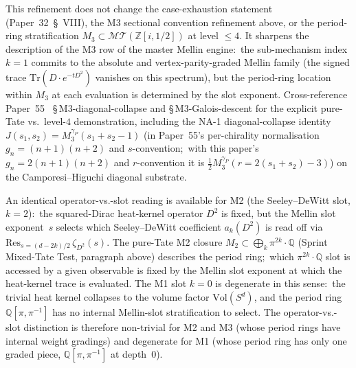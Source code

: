 \documentclass[aps,pra,twocolumn,superscriptaddress,longbibliography]{revtex4-2}
\begin{document}
This refinement does not change the case-exhaustion statement
(Paper~32~\S~VIII), the M3 sectional convention refinement
above, or the period-ring stratification
$M_3 \subset \mathcal{MT}(\mathbb{Z}[i, 1/2])$ at level $\le 4$.
It sharpens the description of the M3 row of the master Mellin
engine:\ the sub-mechanism index $k = 1$ commits to the
absolute and vertex-parity-graded Mellin family (the signed trace
$\mathrm{Tr}(D \cdot e^{-tD^2})$ vanishes on this spectrum), but the period-ring
location within $M_3$ at each evaluation is determined by the slot
exponent.  Cross-reference Paper~55~\cite{loutey_paper55}
\S\,M3-diagonal-collapse and \S\,M3-Galois-descent for the
explicit pure-Tate vs.\ level-$4$ demonstration, including the
NA-1 diagonal-collapse identity
$J(s_1, s_2) = M_3^{\gamma_P}(s_1 + s_2 - 1)$ (in Paper~55's
per-chirality normalisation $g_n = (n+1)(n+2)$ and $s$-convention;\ with
this paper's $g_n = 2(n+1)(n+2)$ and $r$-convention it is
$\tfrac12 M_3^{\gamma_P}(r = 2(s_1+s_2) - 3)$) on the
Camporesi--Higuchi diagonal substrate.

An identical operator-vs.-slot reading is available for M2 (the
Seeley--DeWitt slot, $k = 2$):\ the squared-Dirac heat-kernel
operator $D^2$ is fixed, but the Mellin slot exponent~$s$ selects
which Seeley--DeWitt coefficient $a_k(D^2)$ is read off via
$\mathrm{Res}_{s = (d - 2k)/2}\,\zeta_{D^2}(s)$.  The pure-Tate
M2 closure
$M_2 \subset \bigoplus_k \pi^{2k}\cdot\mathbb{Q}$
(Sprint Mixed-Tate Test, paragraph above) describes the period
ring;\ which $\pi^{2k}\cdot\mathbb{Q}$ slot is accessed by a given
observable is fixed by the Mellin slot exponent at which the
heat-kernel trace is evaluated.  The M1 slot $k = 0$ is degenerate
in this sense:\ the trivial heat kernel collapses to the
volume factor $\mathrm{Vol}(S^d)$, and the period ring
$\mathbb{Q}[\pi, \pi^{-1}]$ has no internal Mellin-slot stratification
to select.  The operator-vs.-slot distinction is therefore
non-trivial for M2 and M3 (whose period rings have internal weight
gradings) and degenerate for M1 (whose period ring has only one
graded piece, $\mathbb{Q}[\pi, \pi^{-1}]$ at depth~$0$).
\end{document}
